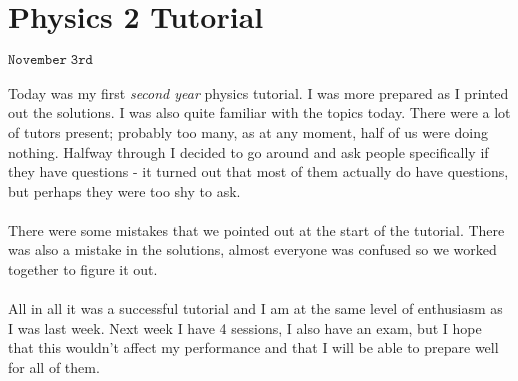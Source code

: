 \section{Physics 2 Tutorial}
\begin{flushright}
$\mathtt{November \; 3rd}$
\end{flushright}
\paragraph{}

Today was my first \emph{second year} physics tutorial. I was more prepared as I printed out the solutions. I was also quite familiar with the topics today. There were a lot of tutors present; probably too many, as at any moment, half of us were doing nothing. Halfway through I decided to go around and ask people specifically if they have questions - it turned out that most of them actually do have questions, but perhaps they were too shy to ask. 
\paragraph{}

There were some mistakes that we pointed out at the start of the tutorial. There was also a mistake in the solutions, almost everyone was confused so we worked together to figure it out. 
\paragraph{}

All in all it was a successful tutorial and I am at the same level of enthusiasm as I was last week. Next week I have 4 sessions, I also have an exam, but I hope that this wouldn't affect my performance and that I will be able to prepare well for all of them.
